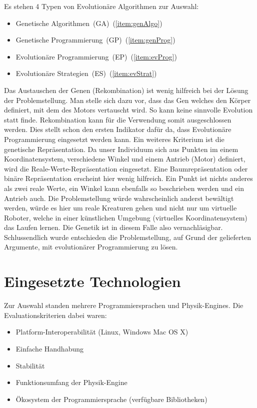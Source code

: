     Es stehen 4 Typen von Evolutionäre Algorithmen zur Auswahl:
    \begin{itemize}
      \item Genetische Algorithmen~(GA)~(\vref{item:genAlgo})
      \item Genetische Programmierung~(GP)~(\vref{item:genProg})
      \item Evolutionäre Programmierung~(EP)~(\vref{item:evProg})
      \item Evolutionäre Strategien~(ES)~(\vref{item:evStrat})
    \end{itemize}
    Das Austauschen der Genen (Rekombination) ist wenig hilfreich bei der Lösung der Problemstellung.
    Man stelle sich dazu vor, dass das Gen welches den Körper definiert, mit dem des Motors vertauscht wird.
    So kann keine sinnvolle Evolution statt finde. Rekombination kann für die Verwendung somit ausgeschlossen werden.
    Dies stellt schon den ersten Indikator dafür da,
    dass Evolutionäre Programmierung eingesetzt werden kann.
    Ein weiteres Kriterium ist die genetische Repräsentation.
    Da unser Individuum sich aus Punkten im einem Koordinatensystem,
    verschiedene Winkel und einem Antrieb (Motor) definiert, wird die Reale-Werte-Repräsentation eingesetzt.
    Eine Baumrepräsentation oder binäre Repräsentation erscheint hier wenig hilfreich.
    Ein Punkt ist nichts anderes als zwei reale Werte,
    ein Winkel kann ebenfalls so beschrieben werden und ein Antrieb auch.
    Die Problemstellung würde wahrscheinlich anderst bewältigt werden,
    würde es hier um reale Kreaturen gehen und nicht nur um virtuelle Roboter,
    welche in einer künstlichen Umgebung (virtuelles Koordinatensystem) das Laufen lernen.
    Die Genetik ist in diesem Falle also vernachläsigbar.
    Schlussendlich wurde entschieden die Problemstellung, auf Grund der gelieferten Argumente, mit evolutionärer Programmierung zu lösen.

  \section{Eingesetzte Technologien\label{sec:Technology}}

    Zur Auswahl standen mehrere Programmiersprachen und Physik-Engines.
    Die Evaluationskriterien dabei waren:
    \begin{itemize}
      \item Platform-Interoperabilität (Linux, Windows Mac OS X)
      \item Einfache Handhabung
      \item Stabilität
      \item Funktionsumfang der Physik-Engine
      \item Ökosystem der Programmiersprache (verfügbare Bibliotheken)
    \end{itemize}

